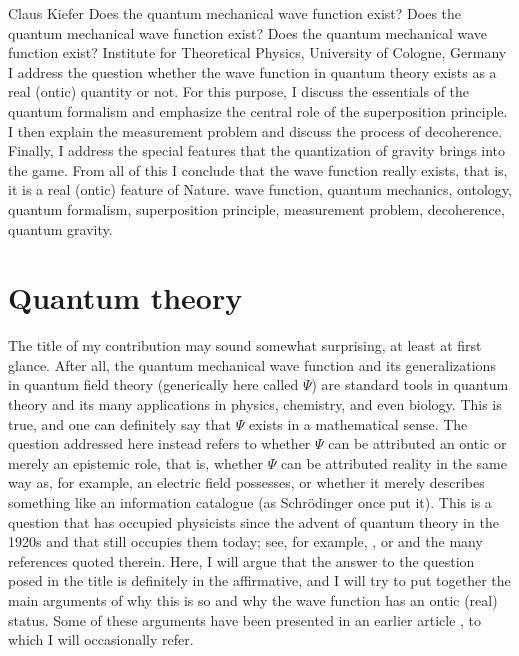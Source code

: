 \begin{artengenv}{Claus Kiefer}
	{Does the quantum mechanical wave function exist?}
	{Does the quantum mechanical wave function exist?}
	{Does the quantum mechanical wave function exist?}
	{Institute for Theoretical Physics, University of Cologne, Germany}
	{I address the question whether the wave function in quantum theory
		exists as a real (ontic) quantity or not. 
		For this purpose, I discuss the essentials of the quantum formalism and emphasize the
		central role of the superposition principle. I then explain the measurement
		problem and discuss the process of decoherence. Finally, I address the
		special features that the quantization of gravity brings into the
		game. From all of this I conclude that the wave function really
		exists, that is, it is a real (ontic) feature of Nature.}
	{wave function, quantum mechanics, ontology, quantum formalism, superposition principle, measurement problem, decoherence, quantum gravity.}







\section{Quantum theory}

\lettrine[loversize=0.13,lines=2,lraise=-0.05,nindent=0em,findent=0.2pt]%
{T}{}he title of my contribution may sound somewhat surprising, at least
at first glance. After all, the quantum mechanical wave function and
its generalizations in quantum field theory (generically here called 
$\Psi$) are standard tools in
quantum theory and its many applications in physics, chemistry, and
even biology. This is true, and one can definitely say that $\Psi$
exists in a mathematical sense. The question addressed here instead refers to
whether $\Psi$ can be attributed an ontic or merely an epistemic role,
that is, whether $\Psi$ can be attributed reality in the same way as,
for example, an electric field possesses, or whether it merely describes
something like an information catalogue (as Schr\"odinger once put
it). This is a question that has occupied physicists since the advent
of quantum theory in the 1920s and that still occupies them today;
see, for example, \parencites{despagnat_veiled_1995}{kiefer_albert_2015},
or \parencite*{boge_quantum_2018} and the many
references quoted therein. Here, I will argue that the answer to
the question posed in the title is definitely in the affirmative, and I
will try to put together the main arguments of why this is so and why
the wave function has an ontic (real) status. Some of these arguments
have been presented in an earlier article \parencite{kiefer_claus_emergence_2012}, to which I
will occasionally refer.  


\end{artengenv}
